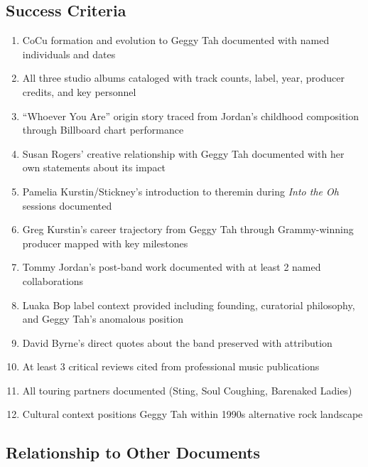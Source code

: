 \documentclass[11pt,letterpaper]{article}
\begin{document}
\subsection{Success Criteria}

\begin{enumerate}[leftmargin=2em]
\item CoCu formation and evolution to Geggy Tah documented with named individuals and dates
\item All three studio albums cataloged with track counts, label, year, producer credits, and key personnel
\item ``Whoever You Are'' origin story traced from Jordan's childhood composition through Billboard chart performance
\item Susan Rogers' creative relationship with Geggy Tah documented with her own statements about its impact
\item Pamelia Kurstin/Stickney's introduction to theremin during \textit{Into the Oh} sessions documented
\item Greg Kurstin's career trajectory from Geggy Tah through Grammy-winning producer mapped with key milestones
\item Tommy Jordan's post-band work documented with at least 2 named collaborations
\item Luaka Bop label context provided including founding, curatorial philosophy, and Geggy Tah's anomalous position
\item David Byrne's direct quotes about the band preserved with attribution
\item At least 3 critical reviews cited from professional music publications
\item All touring partners documented (Sting, Soul Coughing, Barenaked Ladies)
\item Cultural context positions Geggy Tah within 1990s alternative rock landscape
\end{enumerate}

\subsection{Relationship to Other Documents}
\end{document}

